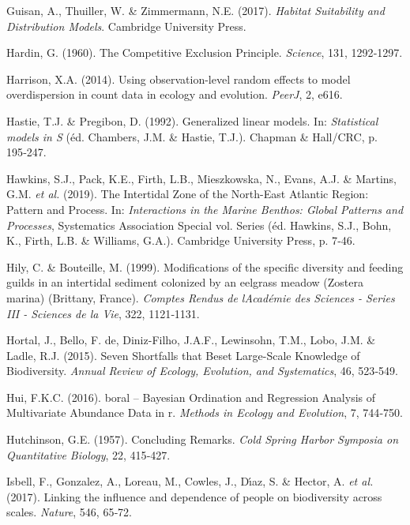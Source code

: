 \documentclass[12pt,]{article}
\newlength{\cslhangindent}
\newenvironment{cslreferences}%
  {\setlength{\parindent}{0pt}%
  \everypar{\setlength{\hangindent}{\cslhangindent}}\ignorespaces}%
  {\par}
\begin{document}
\begin{cslreferences}
\leavevmode\hypertarget{ref-Guisan_2017}{}%
Guisan, A., Thuiller, W. \& Zimmermann, N.E. (2017). \emph{Habitat
Suitability and Distribution Models}. Cambridge University Press.

\leavevmode\hypertarget{ref-Hardin_1960}{}%
Hardin, G. (1960). The Competitive Exclusion Principle. \emph{Science},
131, 1292‑1297.

\leavevmode\hypertarget{ref-Harrison_2014}{}%
Harrison, X.A. (2014). Using observation-level random effects to model
overdispersion in count data in ecology and evolution. \emph{PeerJ}, 2,
e616.

\leavevmode\hypertarget{ref-Hastie_1992}{}%
Hastie, T.J. \& Pregibon, D. (1992). Generalized linear models. In:
\emph{Statistical models in S} (éd. Chambers, J.M. \& Hastie, T.J.).
Chapman \& Hall/CRC, p. 195‑247.

\leavevmode\hypertarget{ref-Hawkins_2019}{}%
Hawkins, S.J., Pack, K.E., Firth, L.B., Mieszkowska, N., Evans, A.J. \&
Martins, G.M. \emph{et al.} (2019). The Intertidal Zone of the
North-East Atlantic Region: Pattern and Process. In: \emph{Interactions
in the Marine Benthos: Global Patterns and Processes}, Systematics
Association Special vol. Series (éd. Hawkins, S.J., Bohn, K., Firth,
L.B. \& Williams, G.A.). Cambridge University Press, p. 7‑46.

\leavevmode\hypertarget{ref-Hily_1999}{}%
Hily, C. \& Bouteille, M. (1999). Modifications of the specific
diversity and feeding guilds in an intertidal sediment colonized by an
eelgrass meadow (Zostera marina) (Brittany, France). \emph{Comptes
Rendus de lAcadémie des Sciences - Series III - Sciences de la Vie},
322, 1121‑1131.

\leavevmode\hypertarget{ref-Hortal_2015}{}%
Hortal, J., Bello, F. de, Diniz-Filho, J.A.F., Lewinsohn, T.M., Lobo,
J.M. \& Ladle, R.J. (2015). Seven Shortfalls that Beset Large-Scale
Knowledge of Biodiversity. \emph{Annual Review of Ecology, Evolution,
and Systematics}, 46, 523‑549.

\leavevmode\hypertarget{ref-Hui_2016}{}%
Hui, F.K.C. (2016). boral -- Bayesian Ordination and Regression Analysis
of Multivariate Abundance Data in r. \emph{Methods in Ecology and
Evolution}, 7, 744‑750.

\leavevmode\hypertarget{ref-Hutchinson_1957}{}%
Hutchinson, G.E. (1957). Concluding Remarks. \emph{Cold Spring Harbor
Symposia on Quantitative Biology}, 22, 415‑427.

\leavevmode\hypertarget{ref-Isbell_2017}{}%
Isbell, F., Gonzalez, A., Loreau, M., Cowles, J., Dı́az, S. \& Hector, A.
\emph{et al.} (2017). Linking the influence and dependence of people on
biodiversity across scales. \emph{Nature}, 546, 65‑72.


\end{cslreferences}
\end{document}

